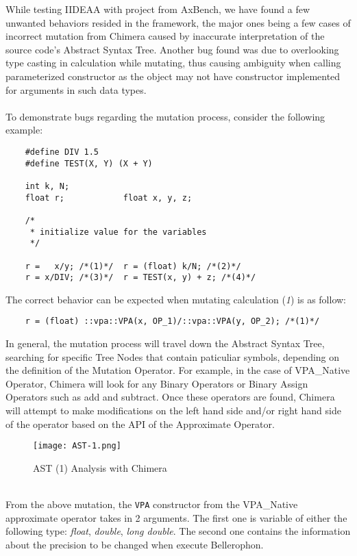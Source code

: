 While testing IIDEAA with project from AxBench, we have found a few unwanted behaviors resided in the framework, the major ones being a few cases of incorrect mutation from Chimera caused by inaccurate interpretation of the source code's Abstract Syntax Tree. Another bug found was due to overlooking type casting in calculation while mutating, thus causing ambiguity when calling parameterized constructor as the object may not have constructor implemented for arguments in such data types. \\
~\\
To demonstrate bugs regarding the mutation process, consider the following example: 
\begin{verbatim}
	#define DIV 1.5
	#define TEST(X, Y) (X + Y)
	
	int k, N;
	float r;			float x, y, z;
	
	/*
	 * initialize value for the variables
	 */
	
	r =   x/y; /*(1)*/	r = (float) k/N; /*(2)*/
	r = x/DIV; /*(3)*/	r = TEST(x, y) + z; /*(4)*/
\end{verbatim}
The correct behavior can be expected when mutating calculation (\textit{1}) is as follow:
\begin{verbatim}
	r = (float) ::vpa::VPA(x, OP_1)/::vpa::VPA(y, OP_2); /*(1)*/
\end{verbatim}
In general, the mutation process will travel down the Abstract Syntax Tree, searching for specific Tree Nodes that contain paticuliar symbols, depending on the definition of the Mutation Operator. For example, in the case of VPA\_Native Operator, Chimera will look for any Binary Operators or Binary Assign Operators such as add and subtract. Once these operators are found, Chimera will attempt to make modifications on the left hand side and/or right hand side of the operator based on the API of the Approximate Operator. \\
\begin{figure}[H]
\texttt{[image: AST-1.png]}
\centering
\caption{AST (1) Analysis with Chimera}
\end{figure}
~\\
From the above mutation, the \verb|VPA| constructor from the VPA\_Native approximate operator takes in 2 arguments. The first one is variable of either the following type: \textit{float}, \textit{double}, \textit{long double}. The second one contains the information about the precision to be changed when execute Bellerophon. \\

